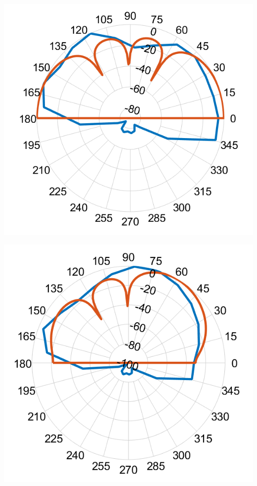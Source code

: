 \documentclass[landscape,a1paper,fontscale=0.5]{baposter} %
\begin{document}
\begin{poster}
{\begin{multicols}{2}
\end{multicols}


\begin{multicols}{2}
\vspace{1em}

\begin{center}
	\includegraphics[width=0.6\linewidth]{deg0hardware.png}
\end{center}

\begin{center}
	\includegraphics[width=0.6\linewidth]{deg60hardware.png}
\end{center}

\end{multicols}

\begin{multicols}{2}
	\vspace{1em}
	

\end{multicols}}
\end{poster}
\end{document}
